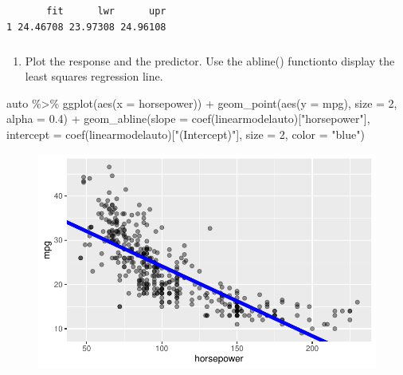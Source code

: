 \documentclass[
  letterpaper,
  DIV=11,
  numbers=noendperiod]{scrartcl}
\let\oldsubparagraph\subparagraph
\renewcommand{\subparagraph}[1]{\oldsubparagraph{#1}\mbox{}}
\newenvironment{Shaded}{\begin{snugshade}}{\end{snugshade}}
\newcommand{\AttributeTok}[1]{\textcolor[rgb]{0.40,0.45,0.13}{#1}}
\newcommand{\DecValTok}[1]{\textcolor[rgb]{0.68,0.00,0.00}{#1}}
\newcommand{\FloatTok}[1]{\textcolor[rgb]{0.68,0.00,0.00}{#1}}
\newcommand{\FunctionTok}[1]{\textcolor[rgb]{0.28,0.35,0.67}{#1}}
\newcommand{\NormalTok}[1]{\textcolor[rgb]{0.00,0.23,0.31}{#1}}
\newcommand{\SpecialCharTok}[1]{\textcolor[rgb]{0.37,0.37,0.37}{#1}}
\newcommand{\StringTok}[1]{\textcolor[rgb]{0.13,0.47,0.30}{#1}}
\providecommand{\tightlist}{%
  \setlength{\itemsep}{0pt}\setlength{\parskip}{0pt}}\usepackage{longtable,booktabs,array}
\begin{document}
\begin{verbatim}
       fit      lwr      upr
1 24.46708 23.97308 24.96108
\end{verbatim}

\hypertarget{section}{%
\subparagraph{}\label{section}}

\begin{enumerate}
\def\labelenumi{\alph{enumi})}
\setcounter{enumi}{1}
\tightlist
\item
  Plot the response and the predictor. Use the abline() functionto
  display the least squares regression line.
\end{enumerate}

\begin{Shaded}
\begin{Highlighting}[]
\NormalTok{auto }\SpecialCharTok{\%\textgreater{}\%}
  \FunctionTok{ggplot}\NormalTok{(}\FunctionTok{aes}\NormalTok{(}\AttributeTok{x =}\NormalTok{ horsepower)) }\SpecialCharTok{+}
  \FunctionTok{geom\_point}\NormalTok{(}\FunctionTok{aes}\NormalTok{(}\AttributeTok{y =}\NormalTok{ mpg), }\AttributeTok{size =} \DecValTok{2}\NormalTok{, }\AttributeTok{alpha =} \FloatTok{0.4}\NormalTok{) }\SpecialCharTok{+}
  \FunctionTok{geom\_abline}\NormalTok{(}\AttributeTok{slope =} \FunctionTok{coef}\NormalTok{(linearmodelauto)[}\StringTok{"horsepower"}\NormalTok{],}
              \AttributeTok{intercept =} \FunctionTok{coef}\NormalTok{(linearmodelauto)[}\StringTok{"(Intercept)"}\NormalTok{],}
              \AttributeTok{size =} \DecValTok{2}\NormalTok{, }\AttributeTok{color =} \StringTok{"blue"}\NormalTok{)}
\end{Highlighting}
\end{Shaded}

\begin{figure}[H]

{\centering \includegraphics{HW-9-Linear-Regression_files/figure-pdf/unnamed-chunk-6-1.pdf}

}

\end{figure}
\end{document}
